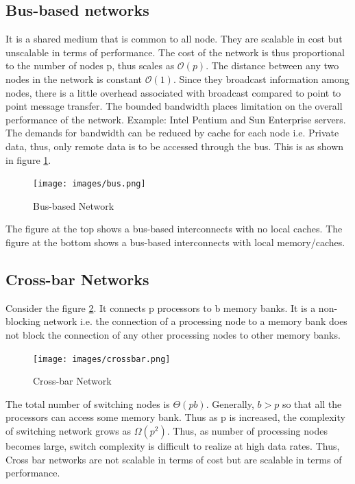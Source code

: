 \documentclass[12pt]{book}
\begin{document}
\subsection{Bus-based networks}
It is a shared medium that is common to all node. They are scalable in cost but unscalable in terms of performance.
The cost of the network is thus proportional to the number of nodes p, thus scales as $\mathcal{O}(p)$. The distance between any two nodes in the network is constant $\mathcal{O}(1)$.
Since they broadcast information among nodes, there is a little overhead associated with broadcast compared to point to point message transfer.
The bounded bandwidth places limitation on the overall performance of the network. Example: Intel Pentium and Sun Enterprise servers. The demands for bandwidth can be reduced by cache for
each node i.e. Private data, thus, only remote data is to be accessed through the bus.
This is as shown in figure \ref{fig:bus}.
\begin{figure}[H]
    \centering
    \texttt{[image: images/bus.png]}
    \caption{Bus-based Network}
    \label{fig:bus}
\end{figure}
The figure at the top shows a bus-based interconnects with no local caches.
The figure at the bottom shows a bus-based interconnects with local memory/caches.

\subsection{Cross-bar Networks}
Consider the figure \ref{fig:crossbar}. It connects p processors to b memory banks.
It is a non-blocking network i.e. the connection of a processing node to a memory bank does not block the connection
of any other processing nodes to other memory banks. 
\begin{figure}[H]
    \centering
    \texttt{[image: images/crossbar.png]}
    \caption{Cross-bar Network}
    \label{fig:crossbar}
\end{figure}
The total number of switching nodes is $\Theta(pb)$. Generally, $b>p$ so that 
all the processors can access some memory bank. Thus as p is increased, the complexity of switching network 
grows as $\Omega(p^2)$. Thus, as number of processing nodes becomes large, switch complexity is difficult to realize
at high data rates. Thus, Cross bar networks are not scalable in terms of cost but are scalable in terms of performance.
\end{document}
